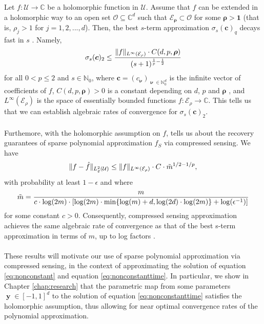 \documentclass[12pt, oneside]{report}   	%
\newcommand{\C}{\mathbb{C}}
\newcommand{\N}{\mathbb{N}}
\DeclarePairedDelimiter{\norm}{\lVert}{\rVert}        %
\DeclareMathOperator{\y}{\boldsymbol{y}}
\DeclareMathOperator{\nuu}{\boldsymbol{\nu}}
\begin{document}
\noindent Let $f:\mathcal{U}\rightarrow\C$ be a holomorphic function in $\mathcal{U}$. Assume that $f$ can be extended in a holomorphic way to an open set $\mathcal{O}\subseteq\C^d$ such that $\boldsymbol{\mathcal{E}_\rho}\subset\mathcal{O}$ for some $\boldsymbol{\rho}>\boldsymbol{1}$ (that is, $\rho_j>1$ for $j=1,2,...,d$). Then, the best $s$-term approximation $\sigma_s(\boldsymbol{c})_q$ decays fast in $s$ \cite[Theorem~3.6]{sparsepoly}. Namely,
\begin{equation}
\label{eq:bounderror}
\sigma_s(\boldsymbol{c})_2 \leq \frac{\norm{f}_{L^{\infty}(\mathcal{\mathcal{E}}_\rho)}\cdot C(d,p,\boldsymbol{\rho})}{(s+1)^{\frac{1}{p}-\frac{1}{2}}}
\end{equation}
for all $0<p\leq 2$ and $s\in\N_0$, where $\boldsymbol{c}=(c_{\nuu})_{\nuu\in\N_0^d}$ is the infinite vector of coefficients of $f$, $C(d,p,\boldsymbol{\rho})>0$ is a constant depending on $d$, $p$ and $\boldsymbol{\rho}$ \cite[Theorem~3.6]{sparsepoly}, and $L^{\infty}(\mathcal{\mathcal{E}}_\rho)$ is the space of essentially bounded functions $f:\mathcal{E}_\rho\to\C$. This tells us that we can establish algebraic rates of convergence for $\sigma_s(\boldsymbol{c})_2$.\\\\
Furthemore, with the holomorphic assumption on $f$, \cite{sparsepoly} tells us about the recovery guarantees of sparse polynomial approximation $f_S$ via compressed sensing. We have
$$
\norm{f-\hat{f}}_{L_\varrho^2(\mathcal{U})} \leq \norm{f}_{L^{\infty}(\mathcal{E}_\rho)} \cdot C \cdot \Tilde{m}^{1/2-1/p},
$$
with probability at least $1-\epsilon$ and where 
$$
\Tilde{m}=\frac{m}{c \cdot \log(2m) \cdot [\log(2m) \cdot \min\{\log(m)+d, \log(2d)\cdot\log(2m)\} + \log(\epsilon^{-1})]}
$$
for some constant $c>0$. Consequently, compressed sensing approximation achieves the same algebraic rate of convergence as that of the best s-term approximation in terms of $m$, up to log factors \cite[Theorem~7.12]{sparsepoly}.\\\\
These results will motivate our use of sparse polynomial approximation via compressed sensing, in the context of approximating the solution of equation \eqref{eq:nonconstant} and equation \eqref{eq:nonconstanttime}. In particular, we show in Chapter \ref{chap:research} that the parametric map from some parameters $\y\in[-1,1]^d$ to the solution of equation \eqref{eq:nonconstanttime} satisfies the holomorphic assumption, thus allowing for near optimal convergence rates of the polynomial approximation.
\end{document}

